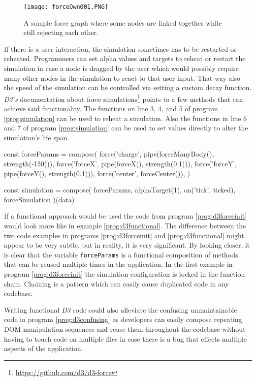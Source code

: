 \begin{figure}
  \centering
  \texttt{[image: forceOwn001.PNG]}
  \caption{A sample force graph where some nodes are linked together while still rejecting each other.}
  \label{fig:force005}
\end{figure}

If there is a user interaction, the simulation sometimes has to be restarted or reheated. Programmers can set alpha values and targets to reheat or restart the simulation in case a node is dragged by the user which would possibly require many other nodes in the simulation to react to that user input. That way also the speed of the simulation can be controlled via setting a custom decay function. \emph{D3's} documentation about force simulations\footnote{\url{https://github.com/d3/d3-force}} points to a few methods that can achieve said functionality. The functions on line 3, 4, and 5 of program \ref{prog:simulation} can be used to reheat a simulation. Also the functions in line 6 and 7 of program \ref{prog:simulation} can be used to set values directly to alter the simulation's life span.

\begin{program}
\caption{D3 written in a fictional functional way}
\label{prog:d3functional}
\begin{JsCode}
const forceParams = compose(
  force('charge', pipe(forceManyBody(), strength(-150))),
  force('forceX', pipe(forceX(), strength(0.1))),
  force('forceY', pipe(forceY(), strength(0.1))),
  force('center', forceCenter()),
)

const simulation = compose(
  forceParams,
  alphaTarget(1),
  on('tick', ticked),
  forceSimulation
)(data)
\end{JsCode}
\end{program}

If a functional approach would be used the code from program \ref{prog:d3forceinit} would look more like in example \ref{prog:d3functional}. The difference between the two code examples in programs \ref{prog:d3forceinit} and \ref{prog:d3functional} might appear to be very subtle, but in reality, it is very significant. By looking closer, it is clear that the variable \texttt{forceParams} is a functional composition of methods that can be reused multiple times in the application. In the first example in program \ref{prog:d3forceinit} the simulation configuration is locked in the function chain. Chaining is a pattern which can easily cause duplicated code in any codebase. 

Writing functional \emph{D3} code could also alleviate the confusing unmaintainable code in program \ref{prog:d3confusing} as developers can easily compose repeating DOM manipulation sequences and reuse them throughout the codebase without having to touch code on multiple files in case there is a bug that effects multiple aspects of the application.
